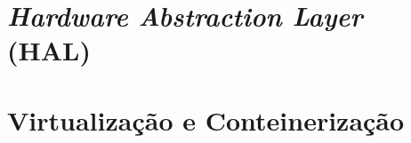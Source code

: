 \section{\nanvix \textit{Hardware Abstraction Layer} (HAL)}
\label{sec.nanvixhal}

\subsection{\nanvix \microkernel}
\label{sec.nanvixmicrokernel}

\subsection{\nanvix \multikernel}
\label{sec.nanvixmultikernel}

\section{Virtualização e Conteinerização}
\label{sec.virtualização}
